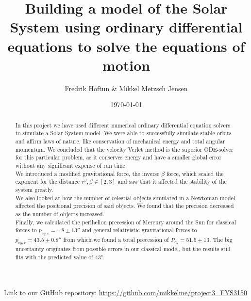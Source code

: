 \documentclass[american,a4paper,12pt]{article}
\title{Building a model of the Solar System using ordinary differential equations to solve the equations of motion}
\author{Fredrik Hoftun \& Mikkel Metzsch Jensen}
\date{\today}
\begin{document}
\maketitle

\begin{abstract}
   In this project we have used different numerical ordinary differential equation solvers to simulate a Solar System model. We were able to successfully simulate stable orbits and affirm laws of nature, like conservation of mechanical energy and total angular momentum. We concluded that the velocity Verlet method is the superior ODE-solver for this particular problem, as it conserves energy and have a smaller global error without any significant expense of run time.\\ We introduced a modified gravitational force, the inverse $\beta$ force, which scaled the exponent for the distance $r^\beta, \beta \in [2,3]$ and saw that it affected the stability of the system greatly.\\ We also looked at how the number of celestial objects simulated in a Newtonian model affected the positional precision of said objects. We found that the precision decreased as the number of objects increased.\\ Finally, we calculated the perihelion precession of Mercury around the Sun for classical forces to $p_{cy,c}=-8\pm 13''$ and general relativistic gravitational forces to $p_{cy,r}=43.5\pm 0.8''$ from which we found a total precession of $P_{cy} = 51.5 \pm 13$. The big uncertainty originates from possible errors in our classical model, but the results still fits with the predicted value of 43".
\end{abstract}
\vfill
\footnotesize{{Link to our GitHub repository: \url{https://github.com/mikkelme/project3_FYS3150}}}
\newpage
\end{document}
